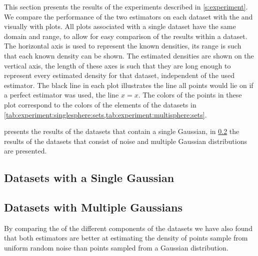 

This section presents the results of the experiments described in \cref{s:experiment}. 
We compare the performance of the two estimators on each dataset with the \mse and visually with plots. 
	All plots associated with a single dataset have the same domain and range, to allow for easy comparison of the results within a dataset. The horizontal axis is used to represent the known densities, its range is such that each known density can be shown. The estimated densities are shown on the vertical axis, the length of these axes is such that they are long enough to represent every estimated density for that dataset, independent of the used estimator. 
	The black line in each plot illustrates the line all points would lie on if a perfect estimator was used, \ie the line $x = x$.
	The colors of the points in these plot correspond to the colors of the elements of the datasets in \cref{tab:experiment:singlesphere:sets,tab:experiment:multisphere:sets}.

	 presents the results of the datasets that contain a single Gaussian, in \cref{s:results:multipleGaussian} the results of the datasets that consist of noise and multiple Gaussian distributions are presented. 

\subsection{Datasets with a Single Gaussian}
\label{s:results:singleGaussian}


\subsection{Datasets with Multiple Gaussians}
\label{s:results:multipleGaussian}


By comparing the \mse of the different components of the datasets we have also found that both estimators are better at estimating the density of points sample from uniform random noise than points sampled from a Gaussian distribution.
